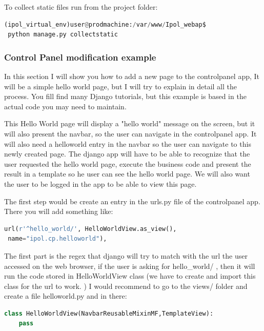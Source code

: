 To collect static files run from the project folder:

\begin{lstlisting}[language=Python,firstnumber=1]
 (ipol_virtual_env)user@prodmachine:/var/www/Ipol_webap$ 
 python manage.py collectstatic
\end{lstlisting}


\subsubsection{Control Panel modification example}

In this section I will show you how to add a new page to the controlpanel app, 
It will be a simple hello world page, but I will try to explain in detail all the process.
You fill find many Django tutorials, but this example is based in the actual code you may need to maintain.

This Hello World page will display a "hello world" message on the screen, but it will also present the navbar, so the user can navigate in the controlpanel app. 
It will also need a helloworld entry in the navbar so the user can navigate to this newly created page. The django app will have to be able to recognize that the user requested the hello world page, execute the business code and present the result in a template so he user can see the hello world page.
We will also want the user to be logged in the app to be able to view this page.
 
The first step would be create an entry in the urls.py file of the controlpanel app.
There you will add something like:

\begin{lstlisting}[language=Python,firstnumber=1]
url(r'^hello_world/', HelloWorldView.as_view(),
 name="ipol.cp.helloworld"),
\end{lstlisting}

The first part is the regex that django will try to match with the url the user accessed on the web browser, if the user is asking for hello\_world/ , then it will run the code stored in HelloWorldView class (we have to create and import this class for the url to work. )
I would recommend to go to the views/ folder and create a file helloworld.py and in there:

\begin{lstlisting}[language=Python,firstnumber=1]
class HelloWorldView(NavbarReusableMixinMF,TemplateView):
	pass
\end{lstlisting}

